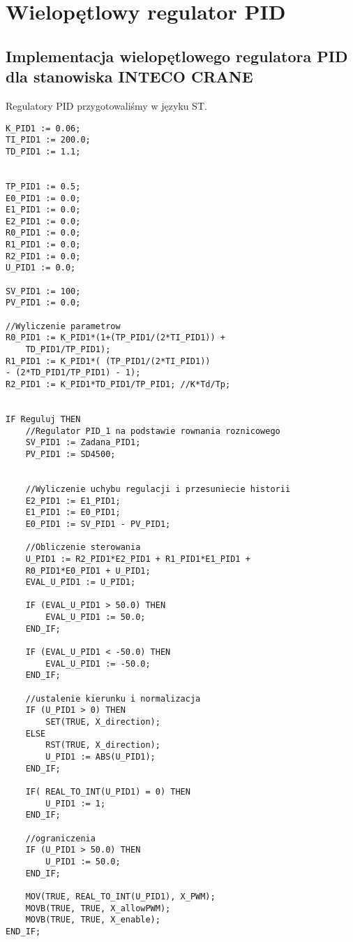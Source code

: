 \chapter{Wielopętlowy regulator PID}
\label{inteco_pid}

\section{Implementacja wielopętlowego regulatora PID dla stanowiska INTECO CRANE}
\label{inteco_impl}

Regulatory PID przygotowaliśmy w języku ST.

\begin{lstlisting}
K_PID1 := 0.06;
TI_PID1 := 200.0;
TD_PID1 := 1.1;
    
    
TP_PID1 := 0.5;
E0_PID1 := 0.0;
E1_PID1 := 0.0;
E2_PID1 := 0.0;
R0_PID1 := 0.0;
R1_PID1 := 0.0;
R2_PID1 := 0.0;
U_PID1 := 0.0;
  
SV_PID1 := 100;
PV_PID1 := 0.0;
    
//Wyliczenie parametrow
R0_PID1 := K_PID1*(1+(TP_PID1/(2*TI_PID1)) + 
    TD_PID1/TP_PID1); 
R1_PID1 := K_PID1*( (TP_PID1/(2*TI_PID1)) 
- (2*TD_PID1/TP_PID1) - 1);
R2_PID1 := K_PID1*TD_PID1/TP_PID1; //K*Td/Tp;


IF Reguluj THEN
    //Regulator PID_1 na podstawie rownania roznicowego
    SV_PID1 := Zadana_PID1;
    PV_PID1 := SD4500; 


    //Wyliczenie uchybu regulacji i przesuniecie historii
    E2_PID1 := E1_PID1;
    E1_PID1 := E0_PID1;
    E0_PID1 := SV_PID1 - PV_PID1;
    
    //Obliczenie sterowania
    U_PID1 := R2_PID1*E2_PID1 + R1_PID1*E1_PID1 + 
    R0_PID1*E0_PID1 + U_PID1;
    EVAL_U_PID1 := U_PID1;
      
    IF (EVAL_U_PID1 > 50.0) THEN
        EVAL_U_PID1 := 50.0;
    END_IF;
        
    IF (EVAL_U_PID1 < -50.0) THEN
        EVAL_U_PID1 := -50.0;
    END_IF;
        
    //ustalenie kierunku i normalizacja
    IF (U_PID1 > 0) THEN
        SET(TRUE, X_direction);
    ELSE
        RST(TRUE, X_direction);
        U_PID1 := ABS(U_PID1);
    END_IF;	
            
    IF( REAL_TO_INT(U_PID1) = 0) THEN
        U_PID1 := 1;
    END_IF;
            
    //ograniczenia
    IF (U_PID1 > 50.0) THEN
        U_PID1 := 50.0;
    END_IF;

    MOV(TRUE, REAL_TO_INT(U_PID1), X_PWM);
    MOVB(TRUE, TRUE, X_allowPWM);
    MOVB(TRUE, TRUE, X_enable);
END_IF;
    
\end{lstlisting}

